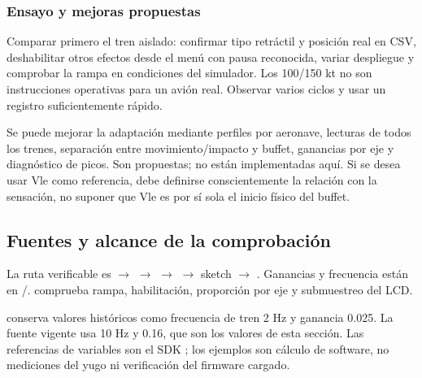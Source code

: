 \subsubsection{Ensayo y mejoras propuestas}
Comparar primero el tren aislado: confirmar tipo retráctil y posición real en CSV, deshabilitar otros efectos desde el menú con pausa reconocida, variar despliegue y comprobar la rampa en condiciones del simulador. Los 100/150 kt no son instrucciones operativas para un avión real. Observar varios ciclos y usar un registro suficientemente rápido.

Se puede mejorar la adaptación mediante perfiles por aeronave, lecturas de todos los trenes, separación entre movimiento/impacto y buffet, ganancias por eje y diagnóstico de picos. Son propuestas; no están implementadas aquí. Si se desea usar Vle como referencia, debe definirse conscientemente la relación con la sensación, no suponer que Vle es por sí sola el inicio físico del buffet.

\subsection{Fuentes y alcance de la comprobación}
La ruta verificable es  $\rightarrow$  $\rightarrow$  $\rightarrow$  $\rightarrow$ sketch $\rightarrow$ . Ganancias y frecuencia están en /.  comprueba rampa, habilitación, proporción por eje y submuestreo del LCD.

 conserva valores históricos como frecuencia de tren 2 Hz y ganancia 0.025. La fuente vigente usa 10 Hz y 0.16, que son los valores de esta sección. Las referencias de variables son el SDK \cite{p3dv3}; los ejemplos son cálculo de software, no mediciones del yugo ni verificación del firmware cargado.
\newpage
